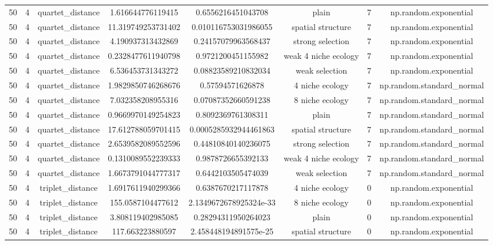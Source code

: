 \begin{longtable}{||c c c c c c c c||}
        50 & 4 & quartet\_distance & 1.616644776119415 & 0.6556216451043708 & plain & 7 & np.random.exponential \\ 
        50 & 4 & quartet\_distance & 11.319749253731402 & 0.010116753031986055 & spatial structure & 7 & np.random.exponential \\ 
        50 & 4 & quartet\_distance & 4.190937313432869 & 0.24157079963568437 & strong selection & 7 & np.random.exponential \\ 
        50 & 4 & quartet\_distance & 0.2328477611940798 & 0.9721200451155982 & weak 4 niche ecology & 7 & np.random.exponential \\ 
        50 & 4 & quartet\_distance & 6.536453731343272 & 0.08823589210832034 & weak selection & 7 & np.random.exponential \\ 
        50 & 4 & quartet\_distance & 1.9829850746268676 & 0.57594571626878 & 4 niche ecology & 7 & np.random.standard\_normal \\ 
        50 & 4 & quartet\_distance & 7.032358208955316 & 0.07087352660591238 & 8 niche ecology & 7 & np.random.standard\_normal \\ 
        50 & 4 & quartet\_distance & 0.9669970149254823 & 0.8092369761308311 & plain & 7 & np.random.standard\_normal \\ 
        50 & 4 & quartet\_distance & 17.612788059701415 & 0.0005285932944461863 & spatial structure & 7 & np.random.standard\_normal \\ 
        50 & 4 & quartet\_distance & 2.6539582089552596 & 0.44810840140236075 & strong selection & 7 & np.random.standard\_normal \\ 
        50 & 4 & quartet\_distance & 0.1310089552239333 & 0.9878726655392133 & weak 4 niche ecology & 7 & np.random.standard\_normal \\ 
        50 & 4 & quartet\_distance & 1.6673791044777317 & 0.6442103505474039 & weak selection & 7 & np.random.standard\_normal \\ 
        50 & 4 & triplet\_distance & 1.6917611940299366 & 0.6387670217117878 & 4 niche ecology & 0 & np.random.exponential \\ 
        50 & 4 & triplet\_distance & 155.0587104477612 & 2.1349672678925324e-33 & 8 niche ecology & 0 & np.random.exponential \\ 
        50 & 4 & triplet\_distance & 3.808119402985085 & 0.28294311950264023 & plain & 0 & np.random.exponential \\ 
        50 & 4 & triplet\_distance & 117.663223880597 & 2.458448194891575e-25 & spatial structure & 0 & np.random.exponential \\ 

\end{longtable}
